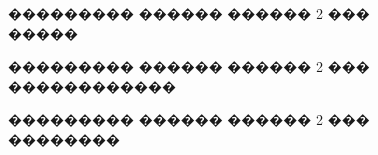 \documentclass[a4paper]{article}
\begin{document}
\begin{figure}[h!]
  \caption{��������� ������ ������ 2 ��� �����}
  \label{s1}
\end{figure}
\begin{figure}[h!]
  \caption{��������� ������ ������ 2 ��� ������������}
  \label{s2}
\end{figure}
\begin{figure}[h!]
  \caption{��������� ������ ������ 2 ��� ��������}
  \label{s3}
\end{figure}
\end{document}
